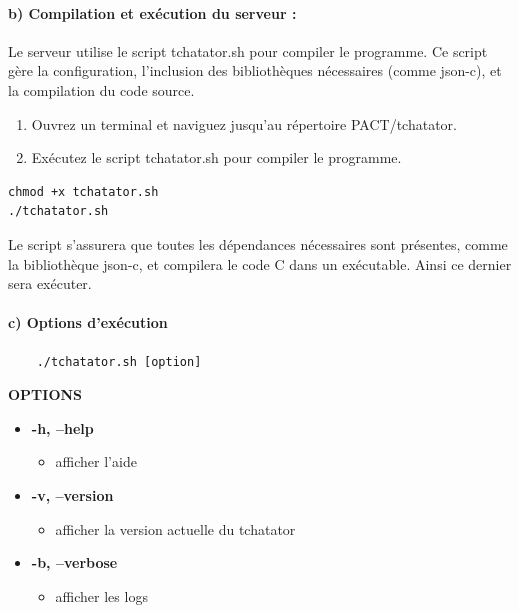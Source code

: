 \documentclass{report}
\begin{document}
\paragraph{b) Compilation et exécution du serveur :} Le serveur utilise le script tchatator.sh pour compiler le programme. Ce script gère la configuration, l'inclusion des bibliothèques nécessaires (comme json-c), et la compilation du code source.

\begin{enumerate}
	\item Ouvrez un terminal et naviguez jusqu'au répertoire PACT/tchatator.
	\item Exécutez le script tchatator.sh pour compiler le programme.
\end{enumerate}

\begin{verbatim}
chmod +x tchatator.sh
./tchatator.sh
\end{verbatim}

Le script s'assurera que toutes les dépendances nécessaires sont présentes, comme la bibliothèque json-c, et compilera le code C dans un exécutable. Ainsi ce dernier sera exécuter.

\paragraph{c) Options d'exécution}

\begin{verbatim}
	./tchatator.sh [option]
\end{verbatim}

\large \textbf{OPTIONS}

\begin{itemize}[label={}]
	\item \textbf{-h, --help}
	\begin{itemize}
		\item afficher l’aide
	\end{itemize}
	\item \textbf{-v, --version}
	\begin{itemize}
		\item afficher la version actuelle du tchatator
	\end{itemize}
	\item \textbf{-b, --verbose}
	\begin{itemize}
		\item afficher les logs
	\end{itemize}
\end{itemize}
\end{document}

